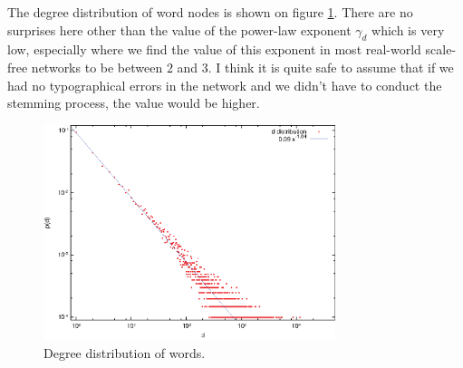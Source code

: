     The degree distribution of word nodes is shown on figure \ref{fig:degdist_words}. There are no surprises here other than the value of the power-law exponent $\gamma_d$ which is very low, especially where we find the value of this exponent in most real-world scale-free networks to be between $2$ and $3$. I think it is quite safe to assume that if we had no typographical errors in the network and we didn't have to conduct the stemming process, the value would be higher.
    \begin{figure}[H]
      \centering
      \includegraphics[width=0.76\textwidth]{chapters/03_implementation/degdist_words}
      \caption{Degree distribution of words.}
      \label{fig:degdist_words}
    \end{figure}
